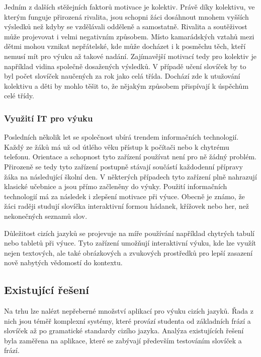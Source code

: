 \documentclass[a4paper,11pt,titlepage,fleqn]{article}
\begin{document}
            Jedním z dalších stěžejních faktorů motivace je kolektiv. Právě díky kolektivu, ve kterým funguje přirozená rivalita, jsou schopni žáci dosáhnout mnohem vyšších výsledků než kdyby se vzdělávali odděleně a samostatně. Rivalita a soutěživost může projevovat i velmi negativním způsobem. Místo kamarádských vztahů mezi dětmi mohou vznikat nepřátelské, kde může docházet i k posměchu těch, kteří nemusí mít pro výuku až takové nadání. Zajímavější motivací tedy pro kolektiv je například vidina společně dosažených výsledků. V případě učení slovíček by to byl počet slovíček naučených za rok jako celá třída. Dochází zde k utužování kolektivu a děti by mohlo těšit to, že nějakým způsobem přispívají k úspěchům celé třídy.

        \subsubsection{Využití IT pro výuku}
            Posledních několik let se společnost ubírá trendem informačních technologií. Každý ze žáků má už od útlého věku přístup k počítači nebo k chytrému telefonu. Orientace a schopnost tyto zařízení používat není pro ně žádný problém. Přirozeně se tedy tyto zařízení postupně stávají součástí každodenní přípravy žáka na následující školní den. V některých případech tyto zařízení plně nahrazují klasické učebnice a jsou přímo začleněny do výuky. Použití informačních technologií má za následek i zlepšení motivace při výuce. Obecně je známo, že žáci raději studují slovíčka interaktivní formou hádanek, křížovek nebo her, než nekonečných seznamů slov.

            Důležitost cizích jazyků se projevuje na míře používání například chytrých tabulí nebo tabletů při výuce. Tyto zařízení umožňují interaktivní výuku, kde lze využít nejen textových, ale také obrázkových a zvukových prostředků pro lepší zasazení nově nabytých vědomostí do kontextu. 


    \subsection{Existující řešení}
        Na trhu lze nalézt nepřeberné množství aplikací pro výuku cizích jazyků. Řada z nich jsou téměř komplexní systémy, které provází studenta od základních frází a slovíček až po gramatické standardy cizího jazyka. Analýza existujících řešení byla zaměřena na aplikace, které se zabývají především testováním slovíček a frází.
\end{document}
